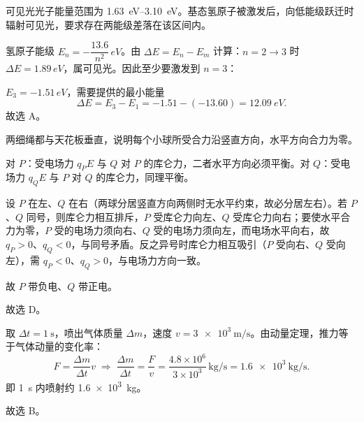 

\begin{answer}
可见光光子能量范围为 \SI{1.63}{eV}--\SI{3.10}{eV}。基态氢原子被激发后，向低能级跃迁时辐射可见光，要求存在两能级差落在该区间内。

氢原子能级 $E_{n}=-\dfrac{13.6}{n^{2}}\,\si{eV}$。由 $\Delta E=E_{n}-E_{m}$ 计算：$n=2\to3$ 时 $\Delta E=1.89\,\si{eV}$，属可见光。因此至少要激发到 $n=3$：

$E_{3}=-1.51\,\si{eV}$，需要提供的最小能量
\[
  \Delta E=E_{3}-E_{1}=-1.51-(-13.60)=\SI{12.09}{eV}.
\]
故选 A。
\end{answer}

\begin{answer}
两细绳都与天花板垂直，说明每个小球所受合力沿竖直方向，水平方向合力为零。

对 $P$：受电场力 $q_{P}E$ 与 $Q$ 对 $P$ 的库仑力，二者水平方向必须平衡。对 $Q$：受电场力 $q_{Q}E$ 与 $P$ 对 $Q$ 的库仑力，同理平衡。

设 $P$ 在左、$Q$ 在右（两球分居竖直方向两侧时无水平约束，故必分居左右）。若 $P$、$Q$ 同号，则库仑力相互排斥，$P$ 受库仑力向左、$Q$ 受库仑力向右；要使水平合力为零，$P$ 受的电场力须向右、$Q$ 受的电场力须向左，而电场水平向右，故 $q_{P}>0$、$q_{Q}<0$，与同号矛盾。反之异号时库仑力相互吸引（$P$ 受向右、$Q$ 受向左），需 $q_{P}<0$、$q_{Q}>0$，与电场力方向一致。

故 $P$ 带负电、$Q$ 带正电。

故选 D。
\end{answer}

\begin{answer}
取 $\Delta t=\SI{1}{\second}$，喷出气体质量 $\Delta m$，速度 $v=\SI{3e3}{\metre\per\second}$。由动量定理，推力等于气体动量的变化率：
\[
  F=\frac{\Delta m}{\Delta t}v
  \;\Longrightarrow\;
  \frac{\Delta m}{\Delta t}=\frac{F}{v}
  =\frac{4.8\times10^{6}}{3\times10^{3}}\,\si{\kilogram\per\second}
  =\SI{1.6e3}{\kilogram\per\second}.
\]
即 \SI{1}{\second} 内喷射约 \SI{1.6e3}{\kilogram}。

故选 B。
\end{answer}

